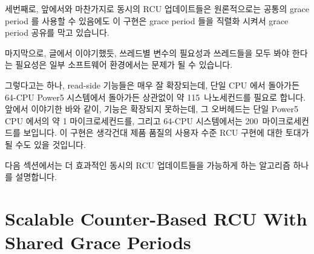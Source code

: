 세번째로, 앞에서와 마찬가지로 동시의 RCU 업데이트들은 원론적으로는 공통의 grace
period 를 사용할 수 있음에도 이 구현은 grace period 들을 직렬화 시켜서 grace
period 공유를 막고 있습니다.

마지막으로, 글에서 이야기했듯, 쓰레드별 변수의 필요성과 쓰레드들을 모두 봐야
한다는 필요성은 일부 소프트웨어 환경에서는 문제가 될 수 있습니다.
\iffalse

This implementation still has several shortcomings.
First, the need to flip \co{rcu_idx} twice imposes substantial overhead
on updates, especially if there are large numbers of threads.

Second, \co{synchronize_rcu()} must now examine a number of variables
that increases linearly with the number of threads, imposing substantial
overhead on applications with large numbers of threads.

Third, as before, although concurrent RCU updates could in principle
be satisfied by a common grace period, this implementation serializes
grace periods, preventing grace-period sharing.

Finally, as noted in the text, the need for per-thread variables
and for enumerating threads may be problematic in some software
environments.
\fi

그렇다고는 하나, read-side 기능들은 매우 잘 확장되는데, 단일 CPU 에서 돌아가든
64-CPU Power5 시스템에서 돌아가든 상관없이 약 115~나노세컨드를 필요로 합니다.
앞에서 이야기한 바와 같이,  기능은 확장되지 못하는데, 그
오버헤드는 단일 Power5 CPU 에서의 약 1 마이크로세컨드를, 그리고 64-CPU
시스템에서는 200~마이크로세컨드를 보입니다.
이 구현은 생각건대 제품 품질의 사용자 수준 RCU 구현에 대한 토대가 될 수도 있을
것입니다.

다음 섹션에서는 더 효과적인 동시의 RCU 업데이트들을 가능하게 하는 알고리즘
하나를 설명합니다.
\iffalse

That said, the read-side primitives scale very nicely, requiring about
115~nanoseconds regardless of whether running on a single-CPU or a 64-CPU
Power5 system.
As noted above, the \co{synchronize_rcu()} primitive does not scale,
ranging in overhead from almost a microsecond on a single Power5 CPU
up to almost 200~microseconds on a 64-CPU system.
This implementation could conceivably form the basis for a
production-quality user-level RCU implementation.

The next section describes an algorithm permitting more efficient
concurrent RCU updates.
\fi

\section{Scalable Counter-Based RCU With Shared Grace Periods}
\label{sec:app:toyrcu:Scalable Counter-Based RCU With Shared Grace Periods}

